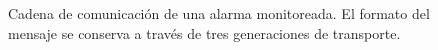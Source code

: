 \begin{figure}[htbp]
{\begin{tikzpicture}[font=\scriptsize]
\end{tikzpicture}}
\caption{Cadena de comunicación de una alarma monitoreada. El formato del mensaje se conserva a través
de tres generaciones de transporte.}
\label{fig:alarmas}
\end{figure}
